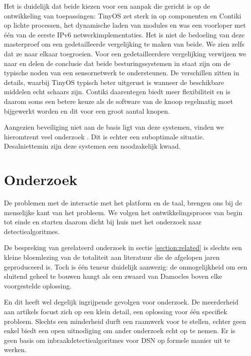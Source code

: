 Het is duidelijk dat beide kiezen voor een aanpak die gericht is op de
ontwikkeling van toepassingen: TinyOS zet sterk in op componenten en Contiki op
lichte processen, het dynamische laden van modules en was een voorloper met
\'e\'en van de eerste IPv6 netwerkimplementaties. Het is niet de bedoeling van
deze masterproef om een gedetailleerde vergelijking te maken van beide. We zien
zelfs dat ze naar elkaar toegroeien. Voor een gedetailleerdere vergelijking
verwijzen we naar \citep{reusing2012comparison} en delen de conclusie dat beide
besturingssystemen in staat zijn om de typische noden van een sensornetwerk te
ondersteunen. De verschillen zitten in details, waarbij TinyOS typisch beter
uitgerust is wanneer de beschikbare middelen echt schaars zijn. Contiki
daarentegen biedt meer flexibiliteit en is daarom soms een betere keuze als de
software van de knoop regelmatig moet bijgewerkt worden en dit voor een groot
aantal knopen.

Aangezien beveiliging niet aan de basis ligt van deze systemen, vinden we
hieromtrent veel onderzoek \citep{paul2009safe, casado2009contikisec,
karlof2004tinysec}. Dit is echter een suboptimale situatie. Desalniettemin zijn
deze systemen een noodzakelijk kwaad.

\section{Onderzoek}
\label{section:problem-research}

De problemen met de interactie met het platform en de taal, brengen ons bij de
menselijke kant van het probleem. We volgen het ontwikkelingsproces van begin
tot einde en starten daarom dicht bij huis met het onderzoek naar
detectiealgoritmes.

De bespreking van gerelateerd onderzoek in sectie \ref{section:related} is
slechts een kleine bloemlezing van de totaliteit aan literatuur die de
afgelopen jaren geproduceerd is. Toch is \'e\'en teneur duidelijk aanwezig: de
onmogelijkheid om een sluitend geheel te bouwen hangt als een zwaard van
Damocles boven elke voorgestelde oplossing.

En dit heeft wel degelijk ingrijpende gevolgen voor onderzoek. De meerderheid
aan artikels focust zich op een klein detail, een oplossing voor \'e\'en
specifiek probleem. Slechts een minderheid durft een raamwerk voor te stellen,
echter geen enkel biedt een open uitnodiging om ander onderzoek echt op te
nemen. Er is geen basis om inbraakdetectiealgoritmes voor DSN op formele manier
uit te werken.

